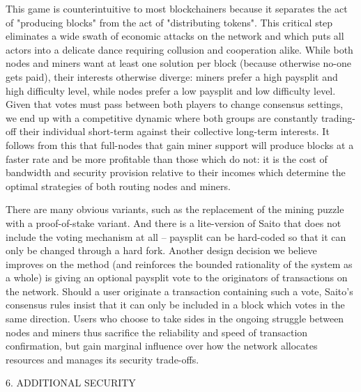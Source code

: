 \documentclass[11.5pt, oneside]{article}   	%
\begin{document}
\begin{multicols}{2}
This game is counterintuitive to most blockchainers because it separates the act of "producing blocks" from the act of "distributing tokens". This critical step eliminates a wide swath of economic attacks on the network and which puts all actors into a delicate dance requiring collusion and cooperation alike. While both nodes and miners want at least one solution per block (because otherwise no-one gets paid), their interests otherwise diverge: miners prefer a high paysplit and high difficulty level, while nodes prefer a low paysplit and low difficulty level. Given that votes must pass between both players to change consensus settings, we end up with a competitive dynamic where both groups are constantly trading-off their individual short-term against their collective long-term interests. It follows from this that full-nodes that gain miner support will produce blocks at a faster rate and be more profitable than those which do not: it is the cost of bandwidth and security provision relative to their incomes which determine the optimal strategies of both routing nodes and miners.

There are many obvious variants, such as the replacement of the mining puzzle with a proof-of-stake variant. And there is a lite-version of Saito that does not include the voting mechanism at all -- paysplit can be hard-coded so that it can only be changed through a hard fork. Another design decision we believe improves on the method (and reinforces the bounded rationality of the system as a whole) is giving an optional paysplit vote to the originators of transactions on the network. Should a user originate a transaction containing such a vote, Saito's consensus rules insist that it can only be included in a block which votes in the same direction. Users who choose to take sides in the ongoing struggle between nodes and miners thus sacrifice the reliability and speed of transaction confirmation, but gain marginal influence over how the network allocates resources and manages its security trade-offs.

6. ADDITIONAL SECURITY


\end{multicols}
\end{document}
